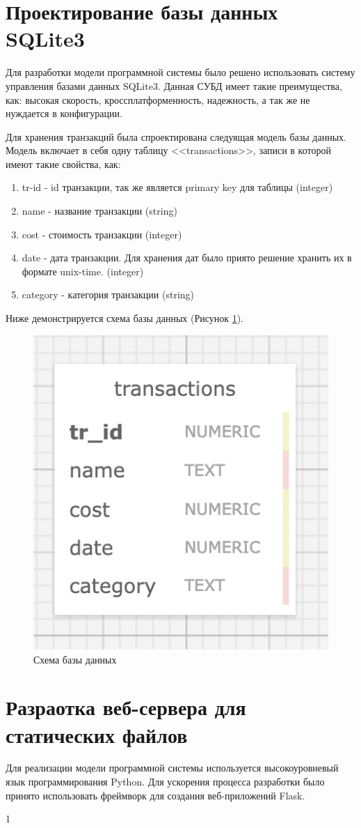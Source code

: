 \documentclass[14pt]{extreport}
\begin{document}
\section{Проектирование базы данных SQLite3}

Для разработки модели программной системы было решено использовать систему управления базами данных SQLite3. Данная СУБД имеет такие преимущества, как: высокая скорость, кроссплатформенность, надежность, а так же не нуждается в конфигурации. 

Для хранения транзакций была спроектирована следуящая модель базы данных. Модель включает в себя одну таблицу <<transactions>>, записи в которой имеют такие свойства, как: 
\begin{enumerate}
    \item tr-id - id транзакции, так же является primary key для таблицы (integer)
    \item name - название транзакции (string)
    \item cost - стоимость транзакции (integer)
    \item date - дата транзакции. Для хранения дат было приято решение хранить их в формате unix-time. (integer)
    \item category - категория транзакции (string)
\end{enumerate}

Ниже демонстрируется схема базы данных (Рисунок \ref{fig:d1}). 

\begin{figure}[h]   
    \centering
    \includegraphics[width=0.5\linewidth]{db.png}
    \caption{ Схема базы данных }
    \label{fig:d1}
\end{figure}

\section{Разраотка веб-сервера для статических файлов}

Для реализации модели программной системы используется высокоуровневый язык программирования Python. Для ускорения процесса разработки было принято использовать фреймворк для создания веб-приложений Flask.



\newpage
\begin{thebibliography}{99}
	 	\label{bib:bib1} 1
\end{thebibliography}
\end{document}
